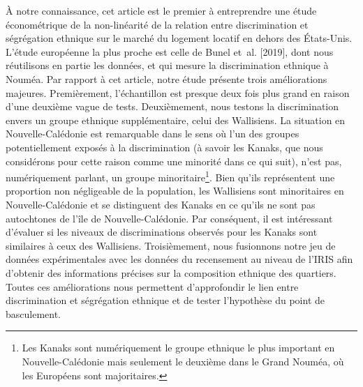 \documentclass[10pt]{Revue-economique} %
\begin{document}
À notre connaissance, cet article est le premier à entreprendre une étude économétrique de la non-linéarité de la relation entre discrimination et ségrégation ethnique sur le marché du logement locatif en dehors des États-Unis. L’étude européenne la plus proche est celle de Bunel et al. [2019], dont nous réutilisons en partie les données, et qui mesure la discrimination ethnique à Nouméa. Par rapport à cet article, notre étude présente trois améliorations majeures. Premièrement, l’échantillon est presque deux fois plus grand en raison d’une deuxième vague de tests. Deuxièmement, nous testons la discrimination envers un groupe ethnique supplémentaire, celui des Wallisiens. La situation en Nouvelle-Calédonie est remarquable dans le sens où l’un des groupes potentiellement exposés à la discrimination (à savoir les Kanaks, que nous considérons pour cette raison comme une minorité dans ce qui suit), n’est pas, numériquement parlant, un groupe minoritaire\footnote{Les Kanaks sont numériquement le groupe ethnique le plus important en Nouvelle-Calédonie mais seulement le deuxième dans le Grand Nouméa, où les Européens sont majoritaires.}. Bien qu’ils représentent une proportion non négligeable de la population, les Wallisiens sont minoritaires en Nouvelle-Calédonie et se distinguent des Kanaks en ce qu’ils ne sont pas autochtones de l’île de Nouvelle-Calédonie. Par conséquent, il est intéressant d’évaluer si les niveaux de discriminations observés pour les Kanaks sont similaires à ceux des Wallisiens. Troisièmement, nous fusionnons notre jeu de données expérimentales avec les données du recensement au niveau de l’IRIS afin d’obtenir des informations précises sur la composition ethnique des quartiers. Toutes ces améliorations nous permettent d’approfondir le lien entre discrimination et ségrégation ethnique et de tester l’hypothèse du point de basculement.
\end{document}
